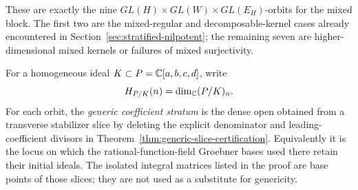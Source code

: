 These are exactly the nine
\(GL(H)\times GL(W)\times GL(E_H)\)-orbits for the mixed block.  The
first two are the mixed-regular and decomposable-kernel cases already
encountered in Section~\ref{sec:stratified-nilpotent}; the remaining
seven are higher-dimensional mixed kernels or failures of mixed
surjectivity.

For a homogeneous ideal \(K\subset
P=\mathbb C[a,b,c,d]\), write
\[
 H_{P/K}(n)=\dim_\mathbb C(P/K)_n.
\]
For each orbit, the \emph{generic coefficient stratum} is the dense
open obtained from a transverse stabilizer slice by deleting the
explicit denominator and leading-coefficient divisors in
Theorem~\ref{thm:generic-slice-certification}.  Equivalently it is
the locus on which the rational-function-field Groebner bases used
there retain their initial ideals.  The isolated integral matrices
listed in the proof are base points of those slices; they are not used
as a substitute for genericity.

